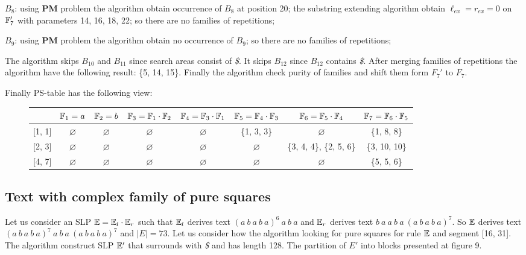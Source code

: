 ﻿\documentclass[11pt]{article}
\begin{document}
\begin{appendix}
\begin{itemize}
  $B_8$: using \textbf{PM} problem the algorithm obtain occurrence of $B_8$ at position 20; the substring extending algorithm
  obtain $\ell_{ex} = r_{ex} = 0$ on $\mathbb{F}_{7}'$ with parameters 14, 16, 18, 22; so there are no families of
  repetitions;
  
  $B_9$: using \textbf{PM} problem the algorithm obtain no occurrence of $B_9$; so there are no families of repetitions;
  
  The algorithm skips $B_{10}$ and $B_{11}$ since search areas consist of \emph{\$}. It skips $B_{12}$ since $B_{12}$
  contains \emph{\$}. After merging families of repetitions the algorithm have the following result: \{5, 14, 15\}. 
  Finally the algorithm check purity of families and shift them form $F_{7}'$ to $F_7$.
  
  Finally PS-table has the following view:
  
  \begin{figure}[h]
	  {\footnotesize\noindent
		\begin{tabular}{|c|c|c|c|c|c|c|c|} \hline
	 	& $\mathbb{F}_{1} = a$ & $\mathbb{F}_{2} = b$ & $\mathbb{F}_{3} = \mathbb{F}_{1} \cdot \mathbb{F}_{2}$ & $\mathbb{F}_{4} = \mathbb{F}_{3} \cdot \mathbb{F}_{1}$ &
	 	$\mathbb{F}_{5} = \mathbb{F}_{4} \cdot \mathbb{F}_{3}$ & $\mathbb{F}_{6} = \mathbb{F}_{5} \cdot \mathbb{F}_{4}$ & $\mathbb{F}_{7} = \mathbb{F}_{6} \cdot \mathbb{F}_{5}$ \\ \hline
	
	 	[1, 1] & $\varnothing$ & $\varnothing$ & $\varnothing$ & $\varnothing$ & \{1, 3, 3\} & $\varnothing$ & \{1, 8, 8\} \\
	 	\hline
	
	 	[2, 3] & $\varnothing$ & $\varnothing$ & $\varnothing$ & $\varnothing$ & $\varnothing$ & \{3, 4, 4\}, \{2, 5, 6\} &
	 	\{3, 10, 10\} \\ \hline
	
	 	[4, 7] & $\varnothing$ & $\varnothing$ & $\varnothing$ & $\varnothing$ & $\varnothing$ & $\varnothing$ & \{5, 5, 6\}
	 	\\ \hline
		\end{tabular}
	  }
  \end{figure}
\end{itemize}

\subsection{Text with complex family of pure squares}
Let us consider an SLP $\mathbb{E} = \mathbb{E}_l \cdot \mathbb{E}_r$ such that $\mathbb{E}_l$ derives text $(a~b~a~b~a)^6~a~b~a$
and $\mathbb{E}_r$ derives text $b~a~a~b~a~(a~b~a~b~a)^7$. So $\mathbb{E}$ derives text $(a~b~a~b~a)^7~a~b~a~(a~b~a~b~a)^7$
and $|E| = 73$. Let us consider how the algorithm looking for pure squares for rule $\mathbb{E}$ and segment [16, 31]. The 
algorithm construct SLP $\mathbb{E}'$ that surrounds with \emph{\$} and has length 128. The partition of $E'$ into blocks
presented at figure 9. 


\end{appendix}
\end{document}

